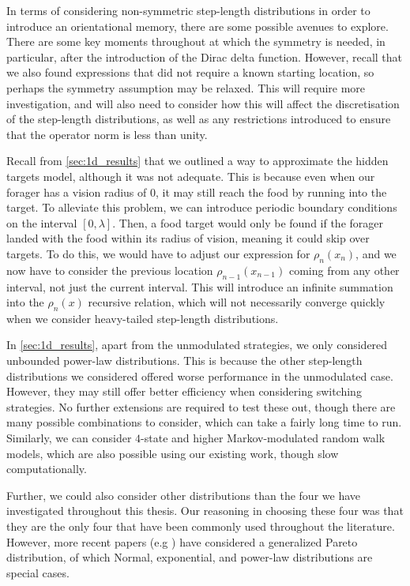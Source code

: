 In terms of considering non-symmetric step-length distributions in order to introduce an orientational memory, there are some possible avenues to explore. There are some key moments throughout  at which the symmetry is needed, in particular, after the introduction of the Dirac delta function. However, recall that we also found expressions that did not require a known starting location, so perhaps the symmetry assumption may be relaxed. This will require more investigation, and  will also need to consider how this will affect the discretisation of the step-length distributions, as well as any restrictions introduced to ensure that the operator norm is less than unity.

Recall from \cref{sec:1d_results} that we outlined a way to approximate the hidden targets model, although it was not adequate. This is because even when our forager has a vision radius of $0$, it may still reach the food by running into the target. To alleviate this problem, we can introduce periodic boundary conditions on the interval $[0,\lambda]$. Then, a food target would only be found if the forager landed with the food within its radius of vision, meaning it could skip over targets. To do this, we would have to adjust our expression for $\rho_n(x_n)$, and we now have to consider the previous location $\rho_{n-1}(x_{n-1})$ coming from any other interval, not just the current interval. This will introduce an infinite summation into the $\rho_n(x)$ recursive relation, which will not necessarily converge quickly when we consider heavy-tailed step-length distributions. 

In \cref{sec:1d_results}, apart from the unmodulated strategies, we only considered unbounded power-law distributions. This is because the other step-length distributions we considered offered worse performance in the unmodulated case. However, they may still offer better efficiency when considering switching strategies. No further extensions are required to test these out, though there are many possible combinations to consider, which can take a fairly long time to run. Similarly, we can consider $4$-state and higher Markov-modulated random walk models, which are also possible using our existing work, though slow computationally.

Further, we could also consider other distributions than the four we have investigated throughout this thesis. Our reasoning in choosing these four was that they are the only four that have been commonly used throughout the literature. However, more recent papers (e.g \cite{Bertrand_2015}) have considered a generalized Pareto distribution, of which Normal, exponential, and power-law distributions are special cases.

